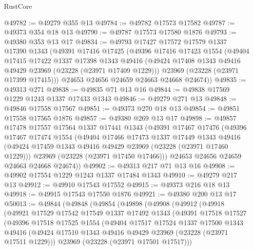 \begin{lexlean}{RustCore}
\begin{coremodule}
@49782 := @49279 @355 @13
@49784 := @49782 @17573 @17582
@49787 := @49373 @354 @18 @13
@49790 := @49787 @17573 @17580 @1876
@49793 := @49380 @353 @13 @17
@49834 := @49793
    @17427
    @17572
    @17579
    @1337
    @17390
    @1343
    (@49391
      @17416
      @17425
      (@49396
        @17416
        @17423
        @1554
        (@49404
          @17415
          @17422
          @1337
          @17398
          @1343
          @49416
          (@49424 @17408 @1343 @49416 @49429 @23969 (@23228 (@23971 @17409 @1229)))
          @23969
          (@23228 (@23971 @17399 @17415)))
        @24653
        @24656
        @24659
        @24663
        @24668
        @24674))
@49835 := @49313 @271
@49838 := @49835 @71 @13 @16
@49844 := @49838 @17569 @1229 @1243 @1337 @17433 @1343
@49846 := @49279 @271 @13
@49848 := @49846 @17558 @17567
@49851 := @49373 @270 @18 @13
@49854 := @49851 @17558 @17565 @1876
@49857 := @49380 @269 @13 @17
@49898 := @49857
    @17478
    @17557
    @17564
    @1337
    @17441
    @1343
    (@49391
      @17467
      @17476
      (@49396
        @17467
        @17474
        @1554
        (@49404
          @17466
          @17473
          @1337
          @17449
          @1343
          @49416
          (@49424 @17459 @1343 @49416 @49429 @23969 (@23228 (@23971 @17460 @1229)))
          @23969
          (@23228 (@23971 @17450 @17466)))
        @24653
        @24656
        @24659
        @24663
        @24668
        @24674))
@49902 := @49313 @217 @71 @13 @16
@49908 := @49902 @17554 @1229 @1243 @1337 @17484 @1343
@49910 := @49279 @217 @13
@49912 := @49910 @17543 @17552
@49915 := @49373 @216 @18 @13
@49918 := @49915 @17543 @17550 @1876
@49921 := @49380 @200 @13 @17
@50013 := @49844
    (@49848
      (@49854
        (@49898
          (@49908
            (@49912
              (@49918
                (@49921
                  @17529
                  @17542
                  @17549
                  @1337
                  @17492
                  @1343
                  (@49391
                    @17518
                    @17527
                    (@49396
                      @17518
                      @17525
                      @1554
                      (@49404
                        @17517
                        @17524
                        @1337
                        @17500
                        @1343
                        @49416
                        (@49424 @17510 @1343 @49416 @49429 @23969 (@23228 (@23971 @17511 @1229)))
                        @23969
                        (@23228 (@23971 @17501 @17517)))

\end{coremodule}
\end{lexlean}
